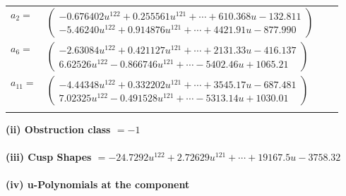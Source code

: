 \documentclass[1p]{elsarticle_modified}
\theoremstyle{definition}
\begin{document}
\begin{tabular}{m{7pt} m{180pt} m{7pt} m{180pt} }
\flushright $a_{2}=$&$\begin{pmatrix}-0.676402 u^{122}+0.255561 u^{121}+\cdots+610.368 u-132.811\\-5.46240 u^{122}+0.914876 u^{121}+\cdots+4421.91 u-877.990\end{pmatrix}$ \\
\flushright $a_{6}=$&$\begin{pmatrix}-2.63084 u^{122}+0.421127 u^{121}+\cdots+2131.33 u-416.137\\6.62526 u^{122}-0.866746 u^{121}+\cdots-5402.46 u+1065.21\end{pmatrix}$ \\
\flushright $a_{11}=$&$\begin{pmatrix}-4.44348 u^{122}+0.332202 u^{121}+\cdots+3545.17 u-687.481\\7.02325 u^{122}-0.491528 u^{121}+\cdots-5313.14 u+1030.01\end{pmatrix}$\\&\end{tabular}
\flushleft \textbf{(ii) Obstruction class $= -1$}\\~\\
\flushleft \textbf{(iii) Cusp Shapes $= -24.7292 u^{122}+2.72629 u^{121}+\cdots+19167.5 u-3758.32$}\\~\\
\newpage\renewcommand{\arraystretch}{1}
\flushleft \textbf{(iv) u-Polynomials at the component}\newline \\
\end{document}
